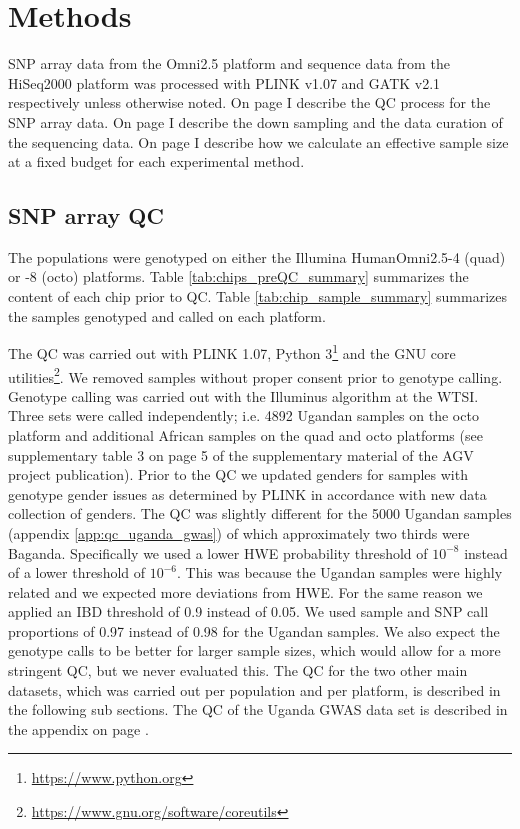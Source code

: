 \section{Methods}

SNP array data from the Omni2.5 platform and sequence data from the HiSeq2000 platform was processed with PLINK v1.07\cite{Purcell2007} and \gls{GATK} v2.1 respectively unless otherwise noted. On page \pageref{subsec:chipQC} I describe the QC process for the SNP array data. On page \pageref{subsec:sequence} I describe the down sampling and the data curation of the sequencing data. On page \pageref{subsec:samplesize} I describe how we calculate an effective sample size at a fixed budget for each experimental method.



\subsection{SNP array QC}
\label{subsec:chipQC}

The populations were genotyped on either the Illumina HumanOmni2.5-4 (quad) or -8 (octo) platforms. Table \ref{tab:chips_preQC_summary} summarizes the content of each chip prior to QC. Table \ref{tab:chip_sample_summary} summarizes the samples genotyped and called on each platform.



The \gls{QC} was carried out with PLINK 1.07\cite{Purcell2007}, Python 3\footnote{\url{https://www.python.org}} and the GNU core utilities\footnote{\url{https://www.gnu.org/software/coreutils}}. We removed samples without proper consent prior to genotype calling. Genotype calling was carried out with the Illuminus algorithm at the \gls{WTSI}. Three sets were called independently; i.e. 4892 Ugandan samples on the octo platform and additional African samples on the quad and octo platforms (see supplementary table 3 on page 5 of the supplementary material of the \gls{AGV} project publication\cite{Gurdasani2015}). Prior to the \gls{QC} we updated genders for samples with genotype gender issues as determined by PLINK in accordance with new data collection of genders. The QC was slightly different for the 5000 Ugandan samples (appendix \ref{app:qc_uganda_gwas}) of which approximately two thirds were Baganda. Specifically we used a lower \gls{HWE} probability threshold of $10^{-8}$ instead of a lower threshold of $10^{-6}$. This was because the Ugandan samples were highly related and we expected more deviations from \gls{HWE}. For the same reason we applied an \gls{IBD} threshold of 0.9 instead of 0.05. We used sample and \gls{SNP} call proportions of 0.97 instead of 0.98 for the Ugandan samples. We also expect the genotype calls to be better for larger sample sizes, which would allow for a more stringent \gls{QC}, but we never evaluated this. The \gls{QC} for the two other main datasets, which was carried out per population and per platform, is described in the following sub sections. The \gls{QC} of the Uganda \gls{GWAS} data set is described in the appendix on page \pageref{app:qc_uganda_gwas}.

